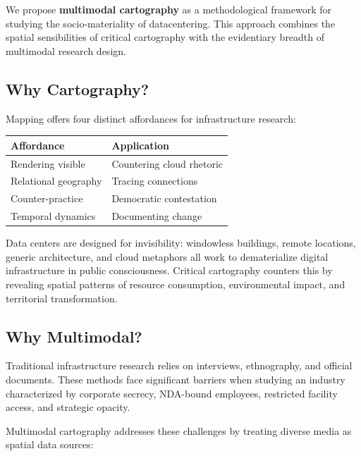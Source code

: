 \documentclass[../../main.tex]{subfiles}
\begin{document}
We propose \textbf{multimodal cartography} as a methodological framework for studying the socio-materiality of datacentering. This approach combines the spatial sensibilities of critical cartography with the evidentiary breadth of multimodal research design.

\subsection{Why Cartography?}

Mapping offers four distinct affordances for infrastructure research:

\begin{margintable}
\caption{Cartographic affordances}
\begin{tabular}{p{2cm}p{3cm}}
\toprule
\textbf{Affordance} & \textbf{Application} \\
\midrule
Rendering visible & Countering cloud rhetoric \\
\addlinespace
Relational geography & Tracing connections \\
\addlinespace
Counter-practice & Democratic contestation \\
\addlinespace
Temporal dynamics & Documenting change \\
\bottomrule
\end{tabular}
\end{margintable}

Data centers are designed for invisibility: windowless buildings, remote locations, generic architecture, and cloud metaphors all work to dematerialize digital infrastructure in public consciousness. Critical cartography counters this by revealing spatial patterns of resource consumption, environmental impact, and territorial transformation.

\subsection{Why Multimodal?}

Traditional infrastructure research relies on interviews, ethnography, and official documents. These methods face significant barriers when studying an industry characterized by corporate secrecy, NDA-bound employees, restricted facility access, and strategic opacity.

Multimodal cartography addresses these challenges by treating diverse media as spatial data sources:
\end{document}
